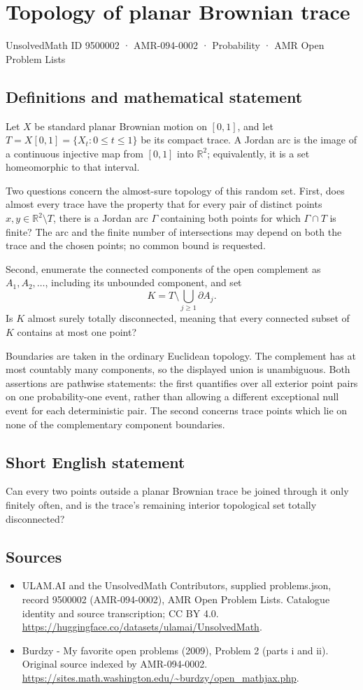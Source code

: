 \documentclass[11pt,a4paper]{article}
\begin{document}
\section*{Topology of planar Brownian trace}\label{9500002}
{\small UnsolvedMath ID 9500002 · AMR-094-0002 · Probability · AMR Open Problem Lists}
\subsection{Definitions and mathematical statement}
Let $X$ be standard planar Brownian motion on $[0,1]$, and let $T=X[0,1]=\{X_t:0\le t\le1\}$ be its compact trace. A Jordan arc is the image of a continuous injective map from $[0,1]$ into $\mathbb R^2$; equivalently, it is a set homeomorphic to that interval.

Two questions concern the almost-sure topology of this random set. First, does almost every trace have the property that for every pair of distinct points $x,y\in\mathbb R^2\setminus T$, there is a Jordan arc $\Gamma$ containing both points for which $\Gamma\cap T$ is finite? The arc and the finite number of intersections may depend on both the trace and the chosen points; no common bound is requested.

Second, enumerate the connected components of the open complement as $A_1,A_2,\ldots$, including its unbounded component, and set
\[
K=T\setminus\bigcup_{j\ge1}\partial A_j.
\]
Is $K$ almost surely totally disconnected, meaning that every connected subset of $K$ contains at most one point?

Boundaries are taken in the ordinary Euclidean topology. The complement has at most countably many components, so the displayed union is unambiguous. Both assertions are pathwise statements: the first quantifies over all exterior point pairs on one probability-one event, rather than allowing a different exceptional null event for each deterministic pair. The second concerns trace points which lie on none of the complementary component boundaries.
\subsection{Short English statement}
Can every two points outside a planar Brownian trace be joined through it only finitely often, and is the trace’s remaining interior topological set totally disconnected?
\subsection{Sources}
\begin{itemize}
\item[S1] ULAM.AI and the UnsolvedMath Contributors, supplied problems.json, record 9500002 (AMR-094-0002), AMR Open Problem Lists. Catalogue identity and source transcription; CC BY 4.0.
\url{https://huggingface.co/datasets/ulamai/UnsolvedMath}.
\item[S2] Burdzy - My favorite open problems (2009), Problem 2 (parts i and ii). Original source indexed by AMR-094-0002.
\url{https://sites.math.washington.edu/~burdzy/open_mathjax.php}.
\end{itemize}
\end{document}
